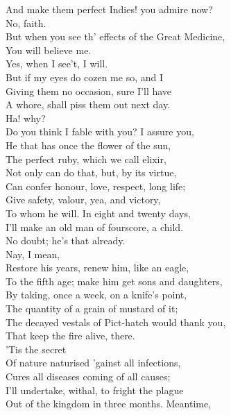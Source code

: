 \documentclass[a4paper,oneside,12pt]{memoir}
\begin{document}
\begin{drama*}
And make them perfect Indies! you admire now?\\
\surlyspeaks No, faith.\\
\mammonspeaks {} But when you see th' effects of the Great Medicine,\\
You will believe me.\\
\surlyspeaks {} Yes, when I see't, I will.\\
But if my eyes do cozen me so, and I\\
Giving them no occasion, sure I'll have\\
A whore, shall piss them out next day.\\
\mammonspeaks {} Ha! why?\\
Do you think I fable with you? I assure you,\\
He that has once the flower of the sun,\\
The perfect ruby, which we call elixir,\\
Not only can do that, but, by its virtue,\\
Can confer honour, love, respect, long life;\\
Give safety, valour, yea, and victory,\\
To whom he will. In eight and twenty days,\\
I'll make an old man of fourscore, a child.\\
\surlyspeaks No doubt; he's that already.\\
\mammonspeaks {} Nay, I mean,\\
Restore his years, renew him, like an eagle,\\
To the fifth age; make him get sons and daughters,\\
By taking, once a week, on a knife's point,\\
The quantity of a grain of mustard of it;\\
\surlyspeaks The decayed vestals of Pict-hatch would thank you,\\
That keep the fire alive, there.\\
\mammonspeaks {} 'Tis the secret\\
Of nature naturised 'gainst all infections,\\
Cures all diseases coming of all causes;\\
I'll undertake, withal, to fright the plague\\
Out of the kingdom in three months. Meantime,\\

\end{drama*}
\end{document}
